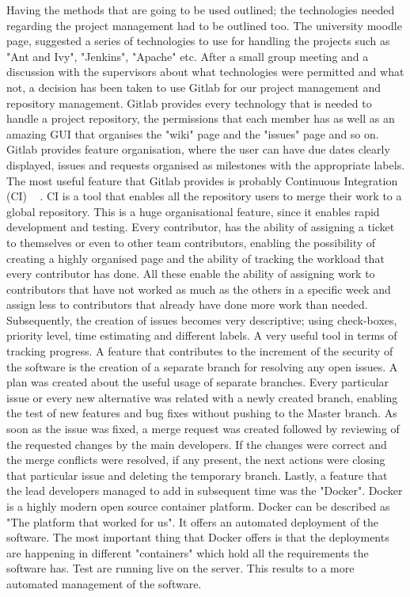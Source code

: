 \documentclass{l3proj}
\begin{document}
Having the methods that are going to be used outlined; the technologies needed regarding the project management had to be outlined too. The university moodle page, suggested a series of technologies to use for handling the projects such as "Ant and Ivy", "Jenkins", "Apache" etc. After a small group meeting and a discussion with the supervisors about what technologies were permitted and what not, a decision has been taken to use Gitlab \cite{Gitlab} for our project management and repository management. Gitlab provides every technology that is needed to handle a project repository, the permissions that each member has as well as an amazing GUI that organises the "wiki" page and the "issues" page and so on. Gitlab provides feature organisation, where the user can have due dates clearly displayed, issues and requests organised as milestones with the appropriate labels. The most useful feature that Gitlab provides is probably Continuous Integration (CI) ~\cite{ci} . CI is a tool that enables all the repository users to merge their work to a global repository. This is a huge organisational feature, since it enables rapid development and testing. Every contributor, has the ability of assigning a ticket to themselves or even to other team contributors, enabling the possibility of creating a highly organised page and the ability of tracking the workload that every contributor has done. All these enable the ability of assigning work to contributors that have not worked as much as the others in a specific week and assign less to contributors that already have done more work than needed. Subsequently, the creation of issues becomes very descriptive; using check-boxes, priority level, time estimating and different labels. A very useful tool in terms of tracking progress. A feature that contributes to the increment of the security of the software is the creation of a separate branch for resolving any open issues. A plan was created about the useful usage of separate branches. Every particular issue or every new alternative was related with a newly created branch, enabling the test of new features and bug fixes without pushing to the Master branch. As soon as the issue was fixed, a merge request was created followed by reviewing of the requested changes by the main developers. If the changes were correct and the merge conflicts were resolved, if any present, the next actions were closing that particular issue and deleting the temporary branch. Lastly, a feature that the lead developers managed to add in subsequent time was the "Docker". Docker is a highly modern open source container platform. Docker can be described as "The platform that worked for us". It offers an automated deployment of the software. The most important thing that Docker offers is that the deployments are happening in different "containers" which hold all the requirements the software has. Test are running live on the server. This results to a more automated management of the software.
\end{document}
